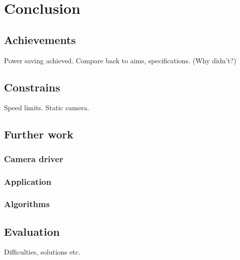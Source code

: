 \chapter{Conclusion} \label{Chapter:Conclusion}

\section{Achievements}

Power saving achieved.
Compare back to aims, specifications. (Why didn't?)

\section{Constrains}

Speed limits.
Static camera.

\section{Further work}

\subsection{Camera driver}

\subsection{Application}

\subsection{Algorithms}

\section{Evaluation}

Difficulties, solutions etc.

